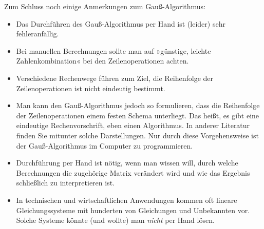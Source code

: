 Zum Schluss noch einige Anmerkungen zum Gauß-Algorithmus:
\begin{itemize}
  \item Das Durchführen des Gauß-Algorithmus per Hand ist (leider) sehr fehleranfällig.
  \item Bei manuellen Berechnungen sollte man auf »günstige, leichte Zahlenkombination« bei den Zeilenoperationen achten.
  \item Verschiedene Rechenwege führen zum Ziel, die Reihenfolge der Zeilenoperationen ist nicht eindeutig bestimmt.
  \item Man kann den Gauß-Algorithmus jedoch so formulieren, dass die Reihenfolge der Zeilenoperationen einem festen Schema unterliegt. Das heißt, es gibt eine eindeutige Rechenvorschrift, eben einen Algorithmus. In anderer Literatur finden Sie mitunter solche Darstellungen. Nur durch diese Vorgehensweise ist der Gauß-Algorithmus im Computer zu programmieren.
  \item Durchführung per Hand ist nötig, wenn man wissen will, durch welche Berechnungen die zugehörige Matrix verändert wird und wie das Ergebnis schließlich zu interpretieren ist.
  \item In technischen und wirtschaftlichen Anwendungen kommen oft lineare Gleichungssysteme mit hunderten von Gleichungen und Unbekannten vor. Solche Systeme könnte (und wollte) man \emph{nicht} per Hand lösen.
\end{itemize}
